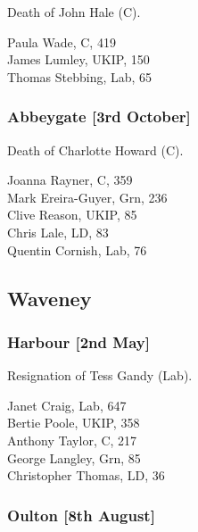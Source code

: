 \documentclass[a4paper,openany,10pt]{book}
\begin{document}
Death of John Hale (C).



Paula Wade, C, 419\\
James Lumley, UKIP, 150\\
Thomas Stebbing, Lab, 65\\


\subsubsection*{Abbeygate \hspace*{\fill}\nolinebreak[1]%
\enspace\hspace*{\fill}
[3rd October]}


Death of Charlotte Howard (C).



Joanna Rayner, C, 359\\
Mark Ereira-Guyer, Grn, 236\\
Clive Reason, UKIP, 85\\
Chris Lale, LD, 83\\
Quentin Cornish, Lab, 76\\


\subsection*{Waveney}

\subsubsection*{Harbour \hspace*{\fill}\nolinebreak[1]%
\enspace\hspace*{\fill}
[2nd May]}


Resignation of Tess Gandy (Lab).



Janet Craig, Lab, 647\\
Bertie Poole, UKIP, 358\\
Anthony Taylor, C, 217\\
George Langley, Grn, 85\\
Christopher Thomas, LD, 36\\


\subsubsection*{Oulton \hspace*{\fill}\nolinebreak[1]%
\enspace\hspace*{\fill}
[8th August]}
\end{document}
